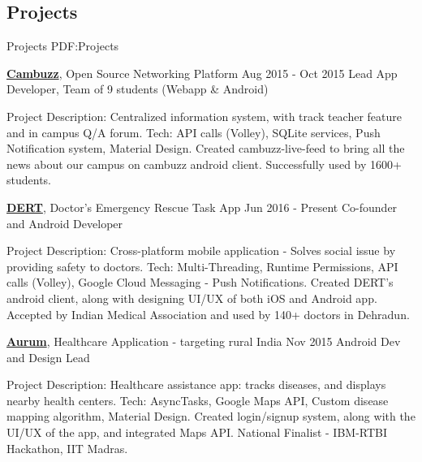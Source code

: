 \documentclass[letterpaper,10pt,oneside]{article}
\begin{document}
\begin{body}

\section
{Projects}
{Projects}
{PDF:Projects}

\href{https://play.google.com/store/apps/details?id=com.cambuzz.internetcabin.cambuzzvitcc}
{\textbf{Cambuzz}}, Open Source Networking Platform
\hfill
{Aug 2015 - Oct 2015}
\GapNoBreak
\BulletItem
Lead App Developer, Team of 9 students (Webapp \& Android)
\begin{detail}
\SubBulletItem
Project Description: Centralized information system, with track teacher feature and in campus Q/A forum.
\SubBulletItem
Tech: API calls (Volley), SQLite services, Push Notification system, Material Design.   
\SubBulletItem
Created cambuzz-live-feed to bring all the news about our campus on cambuzz android client.
\SubBulletItem
Successfully used by 1600+ students.
\end{detail}

\Gap
\href{https://play.google.com/store/apps/details?id=com.dert}
{\textbf{DERT}}, Doctor's Emergency Rescue Task App
\hfill
{Jun 2016 - Present}
\GapNoBreak
\BulletItem
Co-founder and Android Developer
\begin{detail}
\SubBulletItem
Project Description: Cross-platform mobile application - Solves social issue by providing safety to doctors.
\SubBulletItem
Tech: Multi-Threading, Runtime Permissions, API calls (Volley), Google Cloud Messaging - Push Notifications.   
\SubBulletItem
Created DERT's android client, along with designing UI/UX of both iOS and Android app.
\SubBulletItem
Accepted by Indian Medical Association and used by 140+ doctors in Dehradun.
\end{detail}

\Gap
\href{https://play.google.com/store/apps/details?id=com.iotaconcepts.aurum&hl=en}
{\textbf{Aurum}}, Healthcare Application - targeting rural India
\hfill
{Nov 2015}
\GapNoBreak
\BulletItem
Android Dev and Design Lead
\begin{detail}
\SubBulletItem
Project Description: Healthcare assistance app: tracks diseases, and displays nearby health centers. 
\SubBulletItem
Tech: AsyncTasks, Google Maps API, Custom disease mapping algorithm, Material Design.
\SubBulletItem
Created login/signup system, along with the UI/UX of the app, and integrated Maps API.
\SubBulletItem
National Finalist - IBM-RTBI Hackathon, IIT Madras. 
\end{detail}



\end{body}
\end{document}
